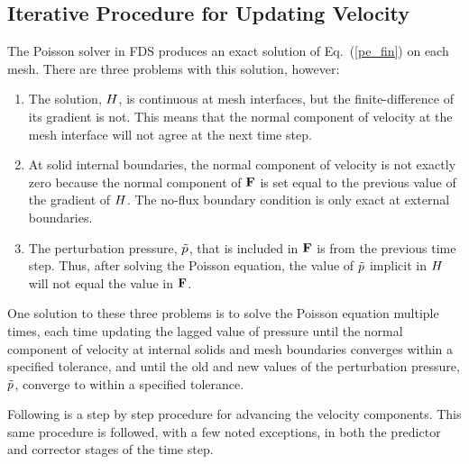 \subsection{Iterative Procedure for Updating Velocity}
\label{section:pressure_iteration}

The Poisson solver in FDS produces an exact solution of Eq.~(\ref{pe_fin}) on each mesh. There are three problems with this solution, however:
\begin{enumerate}
\item The solution, $H$, is continuous at mesh interfaces, but the finite-difference of its gradient is not. This means that the normal component of velocity at the mesh interface will not agree at the next time step.
\item At solid internal boundaries, the normal component of velocity is not exactly zero because the normal component of ${\mathbf{F}}$ is set equal to the previous value of the gradient of $H$. The no-flux boundary condition is only exact at external boundaries.
\item The perturbation pressure, $\tilde{p}$, that is included in ${\mathbf{F}}$ is from the previous time step. Thus, after solving the Poisson equation, the value of $\tilde{p}$ implicit in $H$ will not equal the value in ${\mathbf{F}}$.
\end{enumerate}
One solution to these three problems is to solve the Poisson equation multiple times, each time updating the lagged value of pressure until the normal component of velocity at internal solids and mesh boundaries converges within a specified tolerance, and until the old and new values of the perturbation pressure, $\tilde{p}$, converge to within a specified tolerance.

Following is a step by step procedure for advancing the velocity components. This same procedure is followed, with a few noted exceptions, in both the predictor and corrector stages of the time step.

